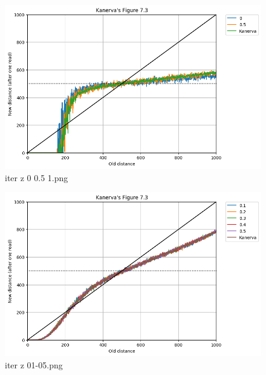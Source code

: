 \documentclass[11pt]{article} %
\begin{document}
\begin{figure}
  \includegraphics[width=\linewidth]{./images02/new-images/iter_z_0_05_1.png}
  \caption{iter z  0  0.5 1.png}
  \label{fig:boat1}
\end{figure}




\begin{figure}
  \includegraphics[width=\linewidth]{./images02/new-images/iter_z_01-05.png}
  \caption{iter z 01-05.png}
  \label{fig:boat1}
\end{figure}
\end{document}

